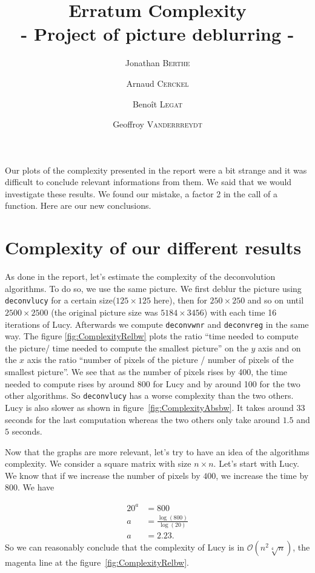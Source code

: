 \documentclass{article}
\title{ \textbf{Erratum Complexity} \\ - Project of picture deblurring - }
\author{Jonathan \textsc{Berthe} \and Arnaud \textsc{Cerckel} \and Benoît \textsc{Legat} \and Geoffroy \textsc{Vanderrreydt}}
\begin{document}
\maketitle

Our plots of the complexity presented in the report were a bit strange and it was difficult to conclude relevant informations from them. We said that we would investigate these results.  We found our mistake, a factor 2 in the call of a function. Here are our new conclusions.  

\section{Complexity of our different results}


As done in the report, let's estimate the complexity of the deconvolution algorithms. To do so, we use the same picture. We first deblur the picture using \texttt{deconvlucy} for a certain size($125 \times 125$ here), then for $250 \times 250$ and so on until $2500 \times 2500$ (the original picture  size was $5184 \times 3456$) with each time 16 iterations of Lucy. Afterwards we compute  \texttt{deconvwnr} and \texttt{deconvreg} in the same way. The figure \ref{fig:ComplexityRelbw} plots the ratio ``time needed to compute the picture/ time needed to compute the smallest picture'' on the $y$ axis and on the $x$ axis the ratio ``number of pixels of the picture / number of pixels of the smallest picture''. We see that as the number of pixels rises by 400, the time needed to compute rises by around 800 for Lucy and by around 100 for the two other algorithms. So \texttt{deconvlucy} has a worse complexity than the two others. Lucy is also slower as shown in figure~\ref{fig:ComplexityAbsbw}. It takes around $33$ seconds for the last computation whereas the two others only take around $1.5$ and $5$ seconds.

Now that the graphs are more relevant, let's try to have an idea of the algorithms complexity. We consider a square matrix with size $n \times n$. Let's start with Lucy. We know that if we increase the number of pixels by $400$, we increase the time by $800$. We have 

\begin{align*}
20^a &= 800\\
a &= \frac{\log(800)}{\log(20)}\\
a &= 2.23.
\end{align*} 
So we can reasonably conclude that the complexity of Lucy is in $\mathcal{O}(n^2\sqrt[4]{n})$, the magenta line at the figure~\ref{fig:ComplexityRelbw}. 
\end{document}
